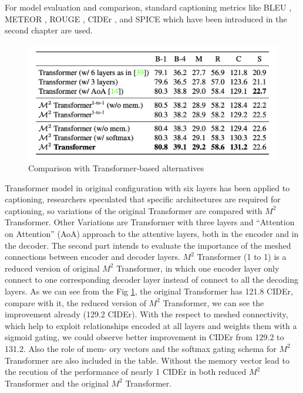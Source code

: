 \documentclass[
]{krantz}
\begin{document}
For model evaluation and comparison, standard captioning metrics like BLEU \citep{papineni-etal-2002-bleu}, METEOR \citep{meteor}, ROUGE \citep{lin-2004-rouge}, CIDEr \citep{cider}, and SPICE \citep{spice} which have been introduced in the second chapter are used.

\begin{figure}

{\centering \includegraphics[width=1\linewidth]{figures/02-01/02-02 compare1} 

}

\caption{Comparison with Transformer-based alternatives \citep{cornia2020m2}}\label{fig:compare1}
\end{figure}



Transformer model in original configuration with six layers has been applied to captioning, researchers speculated that specific architectures are required for captioning, so variations of the original Transformer are compared with \(M^2\) Transformer. Other Variations are Transformer with three layers and ``Attention on Attention'' (AoA) approach \citep{huang1} to the attentive layers, both in the encoder and in the decoder. \citep{cornia2020m2}
The second part intends to evaluate the importance of the meshed connections between encoder and decoder layers. \(M^2\) Transformer (1 to 1) is a reduced version of original \(M^2\) Transformer, in which one encoder layer only connect to one corresponding decoder layer instead of connect to all the decoding layers.
As we can see from the Fig \ref{fig:compare1}, the original Transformer has 121.8 CIDEr, compare with it, the reduced version of \(M^2\) Transformer, we can see the improvement already (129.2 CIDEr). With the respect to meshed connectivity, which help to exploit relationships encoded at all layers and weights them with a sigmoid gating, we could observe better improvement in CIDEr from 129.2 to 131.2. Also the role of mem- ory vectors and the softmax gating schema for \(M^2\) Transformer are also included in the table. Without the memory vector lead to the recution of the performance of nearly 1 CIDEr in both reduced \(M^2\) Transformer and the original \(M^2\) Transformer.\citep{cornia2020m2}
\end{document}
